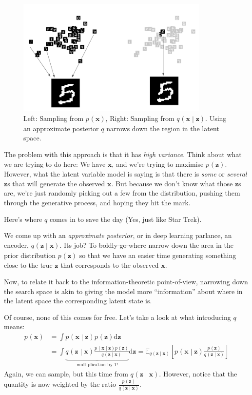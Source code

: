 \documentclass{article}
\newcommand{\prob}[3]{{#1}_{#2} \left( #3 \right)}
\newcommand{\condprob}[4]{{#1}_{#2} \left( #3 \middle| #4 \right)}
\newcommand{\expected}[2]{\mathbb{E}_{#1}\left[ #2 \right]}
\newcommand{\x}{\mathbf{x}}
\newcommand{\z}{\mathbf{z}}
\begin{document}
\begin{figure}
\begin{center}
\includegraphics[width=0.85\textwidth]{figures/q_vs_noq.png}
\caption{Left: Sampling from $\prob{p}{}{\x}$, Right: Sampling from $\condprob{q}{}{\x}{\z}$. Using an approximate posterior $q$ narrows down the region in the latent space.}
\end{center}
\end{figure}
The problem with this approach is that it has \emph{high variance}. Think about what we are trying to do here: We have $\x$, and we're trying to maximise $\prob{p}{}{\z}$. However, what the latent variable model is saying is that there is \emph{some} or \emph{several} $\z$s that will generate the observed $\x$. But because we don't know what those $\z$s are, we're just randomly picking out a few from the distribution, pushing them through the generative process, and hoping they hit the mark.

Here's where $q$ comes in to save the day (Yes, just like Star Trek).

We come up with an \emph{approximate posterior}, or in deep learning parlance, an encoder, $\condprob{q}{}{\z}{\x}$. Its job? To \sout{boldly go where} narrow down the area in the prior distribution $\prob{p}{}{\z}$ so that we have an easier time generating something close to the true $\z$ that corresponds to the observed $\x$. 

Now, to relate it back to the information-theoretic point-of-view, narrowing down the search space is akin to giving the model more ``information'' about where in the latent space the corresponding latent state is.

Of course, none of this comes for free. Let's take a look at what introducing $q$ means:
\begin{align*}
\prob{p}{}{\x} 
&= \int \condprob{p}{}{\x}{\z} \prob{p}{}{\z} \mathrm{d}\z \\
&= \int \underbrace{\condprob{q}{}{\z}{\x} \frac{\condprob{p}{}{\x}{\z} \prob{p}{}{\z}}{\condprob{q}{}{\z}{\x}}}_{\text{multiplication by 1!}} \mathrm{d}\z = \expected{\condprob{q}{}{\z}{\x}}{\condprob{p}{}{\x}{\z} 
\frac{\prob{p}{}{\z}}{\condprob{q}{}{\z}{\x}}} 
\end{align*}
Again, we can sample, but this time from $\condprob{q}{}{\z}{\x}$. 
However, notice that the quantity is now weighted by the ratio $\frac{\prob{p}{}{\z}}{\condprob{q}{}{\z}{\x}}$. 
\end{document}
